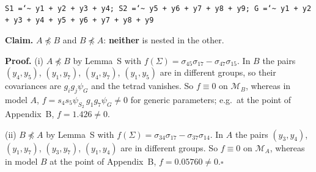 \documentclass[10pt,a4paper]{article}
\newcommand{\nnest}{\not\preceq}
\begin{document}
\begin{minipage}[t]{0.49\textwidth}
\\[1pt]{\scriptsize \texttt{S1 =\char`\~{} y1 + y2 + y3 + y4; S2 =\char`\~{} y5 + y6 + y7 + y8 + y9; G =\char`\~{} y1 + y2 + y3 + y4 + y5 + y6 + y7 + y8 + y9}}\end{minipage}
\par\bigskip
\noindent\textbf{Claim.} $A \nnest B$ and $B \nnest A$: \textbf{neither} is nested in the other.\par\smallskip
\noindent\textbf{Proof.} (i) $A\nnest B$ by Lemma~S with $f(\Sigma)=\sigma_{45}\sigma_{17} - \sigma_{47}\sigma_{15}$. In $B$ the pairs $(y_4,y_5)$, $(y_1,y_7)$, $(y_4,y_7)$, $(y_1,y_5)$ are in different groups, so their covariances are $g_ig_j\psi_G$ and the tetrad vanishes. So $f\equiv0$ on $\mathcal M_B$, whereas in model $A$, $f=s_4s_5\psi_{S_2}\,g_1g_7\psi_G\neq0$ for generic parameters; e.g.\ at the point of Appendix~B, $f=1.426\neq0$.\par\smallskip
\noindent(ii) $B\nnest A$ by Lemma~S with $f(\Sigma)=\sigma_{34}\sigma_{17} - \sigma_{37}\sigma_{14}$. In $A$ the pairs $(y_3,y_4)$, $(y_1,y_7)$, $(y_3,y_7)$, $(y_1,y_4)$ are in different groups. So $f\equiv0$ on $\mathcal M_A$, whereas in model $B$ at the point of Appendix~B, $f=0.05760\neq0$.\hfill$\square$\par\medskip
{}

\clearpage
\end{document}
